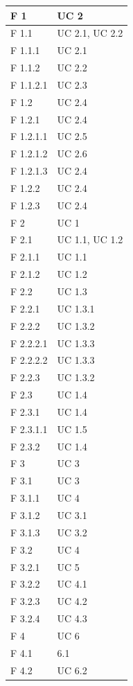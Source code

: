 \documentclass[a4paper,11pt]{article}
\begin{document}
\begin{longtable}{p{}p{}}
F 1 & UC 2\\
\midrule
F 1.1 & UC 2.1, UC 2.2\\
\midrule
F 1.1.1 & UC 2.1\\
\midrule
F 1.1.2 & UC 2.2\\
\midrule
F 1.1.2.1 & UC 2.3\\
\midrule
F 1.2 & UC 2.4\\
\midrule
F 1.2.1 & UC 2.4\\
\midrule
F 1.2.1.1 & UC 2.5\\
\midrule
F 1.2.1.2 & UC 2.6\\
\midrule
F 1.2.1.3 & UC 2.4\\
\midrule
F 1.2.2 & UC 2.4\\
\midrule
F 1.2.3 & UC 2.4\\
\midrule
F 2 & UC 1\\
\midrule
F 2.1 & UC 1.1, UC 1.2\\
\midrule
F 2.1.1 & UC 1.1\\
\midrule
F 2.1.2 & UC 1.2\\
\midrule
F 2.2 & UC 1.3\\
\midrule
F 2.2.1 & UC 1.3.1\\
\midrule
F 2.2.2 & UC 1.3.2\\
\midrule
F 2.2.2.1 & UC 1.3.3\\
\midrule
F 2.2.2.2 & UC 1.3.3\\
\midrule
F 2.2.3 & UC 1.3.2\\
\midrule
F 2.3 & UC 1.4\\
\midrule
F 2.3.1 & UC 1.4\\
\midrule
F 2.3.1.1 & UC 1.5\\
\midrule
F 2.3.2 & UC 1.4\\
\midrule
F 3 & UC 3\\
\midrule
F 3.1 & UC 3\\
\midrule
F 3.1.1 & UC 4\\
\midrule
F 3.1.2 & UC 3.1\\
\midrule
F 3.1.3 & UC 3.2\\
\midrule
F 3.2 & UC 4\\
\midrule
F 3.2.1 & UC 5\\
\midrule
F 3.2.2 & UC 4.1\\
\midrule
F 3.2.3 & UC 4.2\\
\midrule
F 3.2.4 & UC 4.3\\
\midrule
F 4 & UC 6\\
\midrule
F 4.1 & 6.1\\
\midrule
F 4.2 & UC 6.2\\

\end{longtable}
\end{document}
